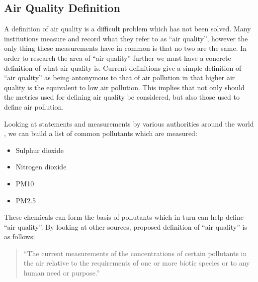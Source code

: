 \subsection{Air Quality Definition}\label{airquality}




A definition of air quality is a difficult problem which has not been solved. Many institutions measure and record what they refer to as ``air quality'', however the only thing these measurements have in common is that no two are the same. In order to research the area of ``air quality'' further we must have a concrete definition of what air quality is. Current definitions give a simple definition of ``air quality'' as being antonymous to that of air pollution in that higher air quality is the equivalent to low air pollution\cite{bcaq}. This implies that not only should the metrics used for defining air quality be considered, but also those used to define air pollution.

Looking at statements and measurements by various authorities around the world \cite{epapollutants}\cite{airqualityobjectives}\cite{cleanairnavigation}\cite{naaqs}\cite{whoguidelines}, we can build a list of common pollutants which are measured:


\begin{itemize}
\item Sulphur dioxide
\item Nitrogen dioxide
\item PM10 
\item PM2.5
\end{itemize}

These chemicals can form the basis of pollutants which in turn can help define ``air quality''. By looking at other sources\cite{meaningsofenvironmentalterms},  proposed definition of ``air quality'' is as follows:

\begin{quote}
``The current measurements of the concentrations of certain pollutants in the air relative to the requirements of one or more biotic species or to any human need or purpose.''
\end{quote}

